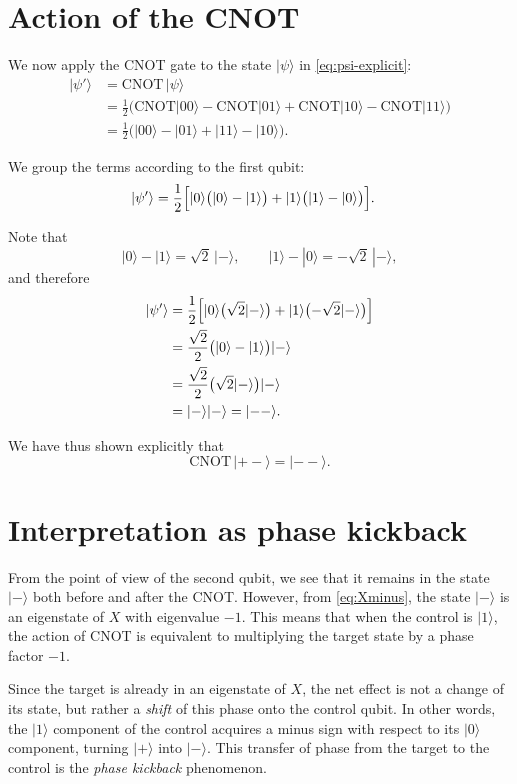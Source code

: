 \documentclass[a4paper,11pt]{article}
\providecommand{\ket}[1]{|{#1}\rangle}
\begin{document}
\section*{Action of the CNOT}

We now apply the CNOT gate to the state \(\ket{\psi}\) in
\eqref{eq:psi-explicit}:
\begin{align}
  \ket{\psi'}
  &= \mathrm{CNOT}\,\ket{\psi} \\
  &= \frac{1}{2}\bigl(
        \mathrm{CNOT}\ket{00}
      - \mathrm{CNOT}\ket{01}
      + \mathrm{CNOT}\ket{10}
      - \mathrm{CNOT}\ket{11}
     \bigr) \\
  &= \frac{1}{2}\bigl(
        \ket{00}
      - \ket{01}
      + \ket{11}
      - \ket{10}
     \bigr).
\end{align}

We group the terms according to the first qubit:
\begin{align}
  \ket{\psi'}
  &= \frac{1}{2}\Bigl[
        \ket{0}\bigl(\ket{0}-\ket{1}\bigr)
      + \ket{1}\bigl(\ket{1}-\ket{0}\bigr)
     \Bigr].
\end{align}

Note that
\begin{equation}
  \ket{0}-\ket{1} = \sqrt{2}\,\ket{-},\qquad
  \ket{1}-\ket{0} = -\sqrt{2}\,\ket{-},
\end{equation}
and therefore
\begin{align}
  \ket{\psi'}
  &= \frac{1}{2}\Bigl[
        \ket{0}\bigl(\sqrt{2}\ket{-}\bigr)
      + \ket{1}\bigl(-\sqrt{2}\ket{-}\bigr)
     \Bigr] \\
  &= \frac{\sqrt{2}}{2}
     \bigl(\ket{0} - \ket{1}\bigr)\ket{-} \\
  &= \frac{\sqrt{2}}{2}
     \bigl(\sqrt{2}\ket{-}\bigr)\ket{-} \\
  &= \ket{-}\ket{-}
   = \ket{- -}.
\end{align}

We have thus shown explicitly that
\begin{equation}
  \mathrm{CNOT}\,\ket{+ -} = \ket{- -}.
\end{equation}

\section*{Interpretation as phase kickback}

From the point of view of the second qubit, we see that it remains in the
state \(\ket{-}\) both before and after the CNOT.
However, from \eqref{eq:Xminus}, the state \(\ket{-}\) is an eigenstate of
\(X\) with eigenvalue \(-1\).
This means that when the control is \(\ket{1}\), the action of CNOT is
equivalent to multiplying the target state by a phase factor \(-1\).

Since the target is already in an eigenstate of \(X\), the net effect is not a
change of its state, but rather a \emph{shift} of this phase onto the control
qubit.
In other words, the \(\ket{1}\) component of the control acquires a minus sign
with respect to its \(\ket{0}\) component, turning \(\ket{+}\) into
\(\ket{-}\).
This transfer of phase from the target to the control is the
\emph{phase kickback} phenomenon.
\end{document}
